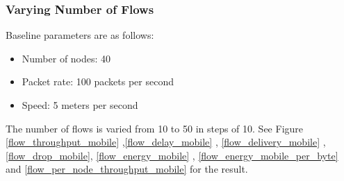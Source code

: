 \subsubsection{Varying Number of Flows}
Baseline parameters are as follows:
\begin{itemize}
    \item Number of nodes: 40
    \item Packet rate: 100 packets per second
    \item Speed: 5 meters per second
\end{itemize}
The number of flows is varied from 10 to 50 in steps of 10.
See Figure \ref{flow_throughput_mobile} ,\ref{flow_delay_mobile} , \ref{flow_delivery_mobile} , \ref{flow_drop_mobile}, \ref{flow_energy_mobile} , \ref{flow_energy_mobile_per_byte} and \ref{flow_per_node_throughput_mobile} for the result.
